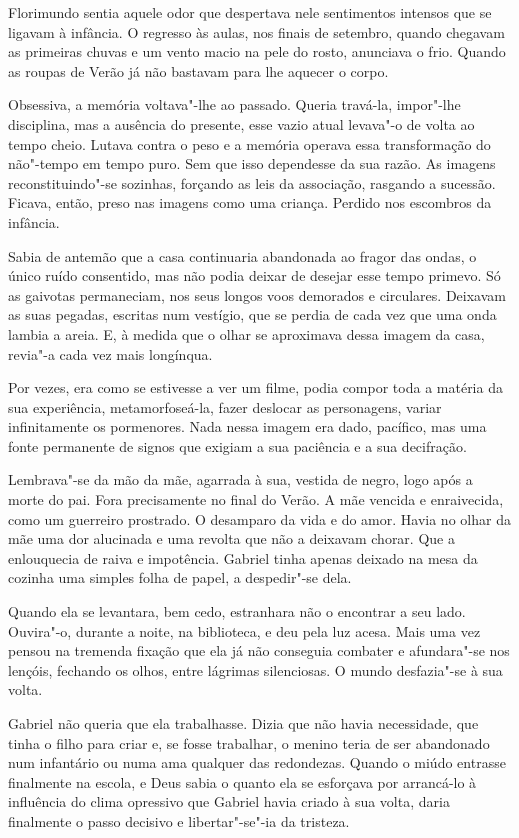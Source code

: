 Florimundo sentia aquele odor que despertava nele sentimentos intensos
que se ligavam à infância. O regresso às aulas, nos finais de setembro,
quando chegavam as primeiras chuvas e um vento macio na pele do rosto,
anunciava o frio. Quando as roupas de Verão já não bastavam para lhe
aquecer o corpo.

Obsessiva, a memória voltava"-lhe ao passado. Queria travá-la, impor"-lhe
disciplina, mas a ausência do presente, esse vazio atual levava"-o de
volta ao tempo cheio. Lutava contra o peso e a memória operava essa
transformação do não"-tempo em tempo puro. Sem que isso dependesse da sua
razão. As imagens reconstituindo"-se sozinhas, forçando as leis da
associação, rasgando a sucessão. Ficava, então, preso nas imagens como
uma criança. Perdido nos escombros da infância.

Sabia de antemão que a casa continuaria abandonada ao fragor das ondas,
o único ruído consentido, mas não podia deixar de desejar esse tempo
primevo. Só as gaivotas permaneciam, nos seus longos voos demorados e
circulares. Deixavam as suas pegadas, escritas num vestígio, que se
perdia de cada vez que uma onda lambia a areia. E, à medida que o olhar
se aproximava dessa imagem da casa, revia"-a cada vez mais longínqua.

Por vezes, era como se estivesse a ver um filme, podia compor toda a
matéria da sua experiência, metamorfoseá-la, fazer deslocar as
personagens, variar infinitamente os pormenores. Nada nessa imagem era
dado, pacífico, mas uma fonte permanente de signos que exigiam a sua
paciência e a sua decifração.

Lembrava"-se da mão da mãe, agarrada à sua, vestida de negro, logo após a
morte do pai. Fora precisamente no final do Verão. A mãe vencida e
enraivecida, como um guerreiro prostrado. O desamparo da vida e do amor.
Havia no olhar da mãe uma dor alucinada e uma revolta que não a deixavam
chorar. Que a enlouquecia de raiva e impotência. Gabriel tinha apenas
deixado na mesa da cozinha uma simples folha de papel, a despedir"-se
dela.

Quando ela se levantara, bem cedo, estranhara não o encontrar a seu
lado. Ouvira"-o, durante a noite, na biblioteca, e deu pela luz acesa.
Mais uma vez pensou na tremenda fixação que ela já não conseguia
combater e afundara"-se nos lençóis, fechando os olhos, entre lágrimas
silenciosas. O mundo desfazia"-se à sua volta.

Gabriel não queria que ela trabalhasse. Dizia que não havia necessidade,
que tinha o filho para criar e, se fosse trabalhar, o menino teria de
ser abandonado num infantário ou numa ama qualquer das redondezas.
Quando o miúdo entrasse finalmente na escola, e Deus sabia o quanto ela
se esforçava por arrancá-lo à influência do clima opressivo que Gabriel
havia criado à sua volta, daria finalmente o passo decisivo e
libertar"-se"-ia da tristeza.

